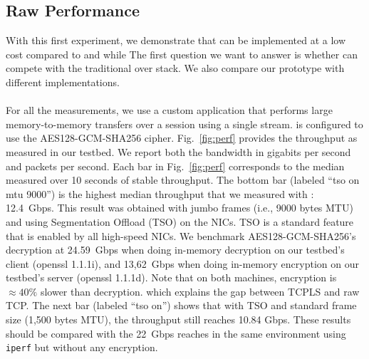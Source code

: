 



\subsection{Raw Performance} \label{sec:perf}

With this first experiment, we demonstrate that \tcpls can be implemented at a
low cost compared to \tcp and \tls while 
The first question we want to answer is whether \tcpls can compete with the
traditional \tls over \tcp stack. We also compare our \tcpls prototype with
different \quic implementations.

\paragraph*{\tcpls}
For all the \tcpls measurements, we use a custom application that performs
large memory-to-memory transfers over a \tcpls session using a single stream.
\tcpls is configured to use the AES128-GCM-SHA256 cipher. Fig.~\ref{fig:perf}
provides the throughput as measured in our testbed. We report both the bandwidth in
gigabits per second and packets per second. Each bar in Fig.~\ref{fig:perf}
corresponds to the median measured over 10 seconds of stable throughput. The
bottom bar (labeled ``\tcpls tso on mtu 9000'') is the highest median throughput
that we measured with \tcpls: 12.4~Gbps. This result was obtained with jumbo
frames (i.e., 9000 bytes MTU) and using \tcp Segmentation Offload (TSO) on the
NICs. TSO is a standard feature that is enabled by all high-speed NICs. We
benchmark AES128-GCM-SHA256's decryption at
24.59~Gbps when doing in-memory decryption on our testbed's client (openssl
1.1.1i), and
13,62~Gbps when doing in-memory encryption on our testbed's server (openssl
1.1.1d). Note that on
both machines, encryption is $\approx 40\%$ slower than decryption.
which explains the gap between TCPLS and raw TCP.
The next bar (labeled ``\tcpls tso on'') shows that with TSO and standard frame
size (1,500 bytes MTU), the throughput still reaches 10.84 Gbps. These
results should be compared with the 22~Gbps \tcp reaches in the same
environment using \texttt{iperf} but without any encryption.



